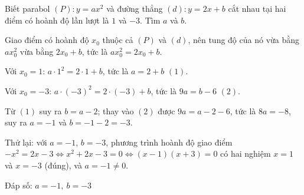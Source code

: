 \begin{problem}[9DS-HSB2-044]
Biết parabol $(P)\colon y = ax^2$ và đường thẳng $(d)\colon y = 2x + b$ cắt nhau tại hai điểm có hoành độ lần lượt là $1$ và $-3$. Tìm $a$ và $b$.

\begin{solution}
Giao điểm có hoành độ $x_0$ thuộc cả $(P)$ và $(d)$, nên tung độ của nó vừa bằng $ax_0^2$ vừa bằng $2x_0 + b$, tức là $ax_0^2 = 2x_0 + b$.

Với $x_0 = 1$: $a \cdot 1^2 = 2 \cdot 1 + b$, tức là $a = 2 + b$ $(1)$.

Với $x_0 = -3$: $a \cdot (-3)^2 = 2 \cdot (-3) + b$, tức là $9a = b - 6$ $(2)$.

Từ $(1)$ suy ra $b = a - 2$; thay vào $(2)$ được $9a = a - 2 - 6$, tức là $8a = -8$, suy ra $a = -1$ và $b = -1 - 2 = -3$.

Thử lại: với $a = -1$, $b = -3$, phương trình hoành độ giao điểm $-x^2 = 2x - 3 \Leftrightarrow x^2 + 2x - 3 = 0 \Leftrightarrow (x - 1)(x + 3) = 0$ có hai nghiệm $x = 1$ và $x = -3$ (đúng), và $a = -1 \neq 0$.

Đáp số: $\boxed{a = -1,\ b = -3}$
\end{solution}
\end{problem}

